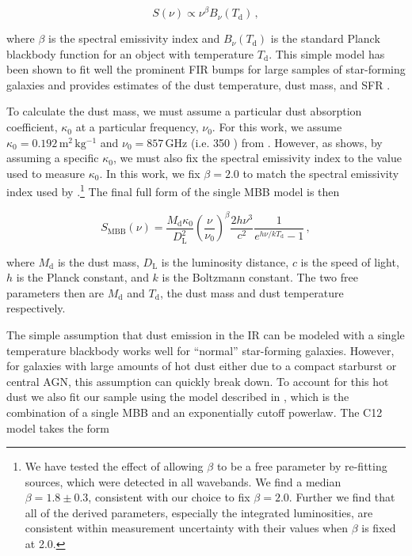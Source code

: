 \documentclass[fleqn, usenatbib]{mnras}
\begin{document}
\begin{equation}
S(\nu) \propto \nu^{\beta}B_{\nu}(T_{\mathrm{d}})\,,
\end{equation}

\noindent where $\beta$ is the spectral emissivity index and $B_{\nu}(T_{\mathrm{d}})$ is the standard Planck blackbody function for an object with temperature $T_{\mathrm{d}}$. This simple model has been shown to fit well the prominent FIR bumps for large samples of star-forming galaxies  and provides estimates of the dust temperature, dust mass, and SFR \cite[e.g.][]{Calzetti:2000fk, Bianchi:2013jk, Cortese:2014qq}.

To calculate the dust mass, we must assume a particular dust absorption coefficient, $\kappa_{0}$ at a particular frequency, $\nu_{0}$. For this work, we assume $\kappa_{0}=0.192\,\mathrm{m^{2}\,kg^{-1}}$ and $\nu_{0}=857\,\mathrm{GHz}$ (i.e. 350 \micron) from \citet{Draine:2003gd}. However, as \citet{Bianchi:2013jk} shows, by assuming a specific $\kappa_{0}$, we must also fix the spectral emissivity index to the value used to measure $\kappa_{0}$. In this work, we fix $\beta=2.0$ to match the spectral emissivity index used by \citet{Draine:2003gd}.\footnote{We have tested the effect of allowing $\beta$ to be a free parameter by re-fitting sources, which were detected in all wavebands. We find a median $\beta=1.8\pm0.3$, consistent with our choice to fix $\beta=2.0$. Further we find that all of the derived parameters, especially the integrated luminosities, are consistent within measurement uncertainty with their values when $\beta$ is fixed at 2.0.} The final full form of the single MBB model is then

\begin{equation}\label{eq:greybody}
S_{\mathrm{MBB}}(\nu) = \frac{M_{\mathrm{d}}\kappa_{0}}{D_{\mathrm{L}}^2}\left(\frac{\nu}{\nu_{0}}\right)^{\beta}\frac{2h\nu^{3}}{c^{2}}\frac{1}{e^{{h\nu/kT_{\mathrm{d}}}}-1}\,,
\end{equation}

\noindent where $M_{\mathrm{d}}$ is the dust mass, $D_{\mathrm{L}}$ is the luminosity distance, $c$ is the speed of light, $h$ is the Planck constant, and $k$ is the Boltzmann constant. The two free parameters then are $M_{\mathrm{d}}$ and $T_{\mathrm{d}}$, the dust mass and dust temperature respectively.

The simple assumption that dust emission in the IR can be modeled with a single temperature blackbody works well for ``normal'' star-forming galaxies. However, for galaxies with large amounts of hot dust either due to a compact starburst or central AGN, this assumption can quickly break down. To account for this hot dust we also fit our sample using the model described in \citet[][hereafter C12]{Casey:2012jl}, which is the combination of a single MBB and an exponentially cutoff powerlaw. The C12 model takes the form
\end{document}
